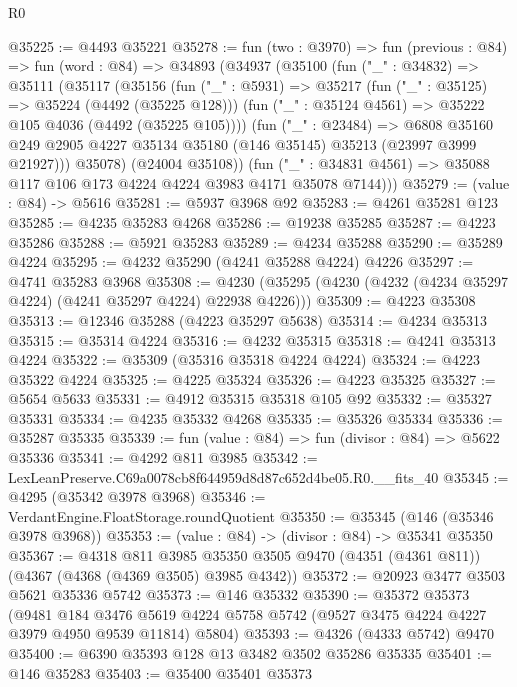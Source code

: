 \begin{lexlean}{R0}
\begin{coremodule}
@35225 := @4493 @35221
@35278 := fun (two : @3970) =>
  fun (previous : @84) =>
  fun (word : @84) =>
  @34893
    (@34937
      (@35100
        (fun ("_" : @34832) =>
        @35111
          (@35117
            (@35156
              (fun ("_" : @5931) =>
              @35217
                (fun ("_" : @35125) => @35224 (@4492 (@35225 @128)))
                (fun ("_" : @35124 @4561) => @35222 @105 @4036 (@4492 (@35225 @105))))
              (fun ("_" : @23484) =>
              @6808
                @35160
                @249
                @2905
                @4227
                @35134
                @35180
                (@146 @35145)
                @35213
                (@23997 @3999 @21927)))
            @35078)
          (@24004 @35108))
        (fun ("_" : @34831 @4561) => @35088 @117 @106 @173 @4224 @4224 @3983 @4171 @35078 @7144)))
@35279 := (value : @84) -> @5616
@35281 := @5937 @3968 @92
@35283 := @4261 @35281 @123
@35285 := @4235 @35283 @4268
@35286 := @19238 @35285
@35287 := @4223 @35286
@35288 := @5921 @35283
@35289 := @4234 @35288
@35290 := @35289 @4224
@35295 := @4232 @35290 (@4241 @35288 @4224) @4226
@35297 := @4741 @35283 @3968
@35308 := @4230 (@35295 (@4230 (@4232 (@4234 @35297 @4224) (@4241 @35297 @4224) @22938 @4226)))
@35309 := @4223 @35308
@35313 := @12346 @35288 (@4223 @35297 @5638)
@35314 := @4234 @35313
@35315 := @35314 @4224
@35316 := @4232 @35315
@35318 := @4241 @35313 @4224
@35322 := @35309 (@35316 @35318 @4224 @4224)
@35324 := @4223 @35322 @4224
@35325 := @4225 @35324
@35326 := @4223 @35325
@35327 := @5654 @5633
@35331 := @4912 @35315 @35318 @105 @92
@35332 := @35327 @35331
@35334 := @4235 @35332 @4268
@35335 := @35326 @35334
@35336 := @35287 @35335
@35339 := fun (value : @84) => fun (divisor : @84) => @5622 @35336
@35341 := @4292 @811 @3985
@35342 := LexLeanPreserve.C69a0078cb8f644959d8d87c652d4be05.R0.__fits_40
@35345 := @4295 (@35342 @3978 @3968)
@35346 := VerdantEngine.FloatStorage.roundQuotient
@35350 := @35345 (@146 (@35346 @3978 @3968))
@35353 := (value : @84) -> (divisor : @84) -> @35341 @35350
@35367 := @4318
    @811
    @3985
    @35350
    @3505
    @9470
    (@4351 (@4361 @811))
    (@4367 (@4368 (@4369 @3505) @3985 @4342))
@35372 := @20923 @3477 @3503 @5621 @35336 @5742
@35373 := @146 @35332
@35390 := @35372
    @35373
    (@9481
      @184
      @3476
      @5619
      @4224
      @5758
      @5742
      (@9527 @3475 @4224 @4227 @3979 @4950 @9539 @11814)
      @5804)
@35393 := @4326 (@4333 @5742) @9470
@35400 := @6390 @35393 @128 @13 @3482 @3502 @35286 @35335
@35401 := @146 @35283
@35403 := @35400 @35401 @35373

\end{coremodule}
\end{lexlean}
